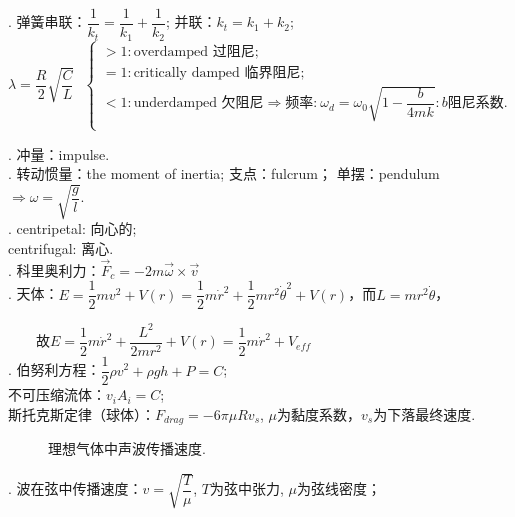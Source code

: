 \documentclass[12pt, 
]{article}
\begin{document}
. 弹簧串联：$\dfrac{1}{k_t}=\dfrac{1}{k_1}+\dfrac{1}{k_2}$; 并联：$k_t=k_1+k_2$;
\begin{equation*}
	\lambda=\frac{R}{2}\sqrt{\frac{C}{L}}~~~\left\{
		\begin{array}{l}
			>1:\text{overdamped  过阻尼;}\\
			=1:\text{critically damped 临界阻尼;}\\
			<1:\text{underdamped 欠阻尼}\Rightarrow\text{频率:}~\omega_d=\omega_0\sqrt{1-\dfrac{b}{4mk}}:b\text{阻尼系数.}\\
		\end{array}
		\right.
\end{equation*}

. 冲量：impulse.~\\

. 转动惯量：the moment of inertia; 支点：fulcrum； 单摆：pendulum$\Rightarrow\omega=\sqrt{\dfrac{g}{l}}$.~\\

. centripetal: 向心的;\\
			\phantom{~~~~}centrifugal: 离心.\\

. 科里奥利力：$\vec{F}_c=-2m\vec{\omega}\times\vec{v}$~\\

. 天体：$E=\dfrac{1}{2}mv^2+V(r)=\dfrac{1}{2}m\dot{r}^2+\dfrac{1}{2}mr^2\dot{\theta}^2+V(r)$，而$L=mr^2\dot{\theta}$，

~~~~故$E=\dfrac{1}{2}m\dot{r}^2+\dfrac{L^2}{2mr^2}+V(r)=\dfrac{1}{2}m\dot{r}^2+V_{eff}$
~\\

. 伯努利方程：$\dfrac{1}{2}\rho v^2+\rho gh+P=C$;
~\\\phantom{~~~~}不可压缩流体：$v_iA_i=C$;
~\\\phantom{~~~~}斯托克斯定律（球体）：$F_{drag}=-6\pi\mu Rv_s$, $\mu$为黏度系数，$v_s$为下落最终速度.\\
\begin{figure}
\hspace{0.8cm}
	\caption{理想气体中声波传播速度.}
\label{fg:1}
\end{figure}
. 波在弦中传播速度：$v=\sqrt{\dfrac{T}{\mu}}$, $T$为弦中张力, \phantom{~~~~~~}$\mu$为弦线密度；
~\\
\end{document}
